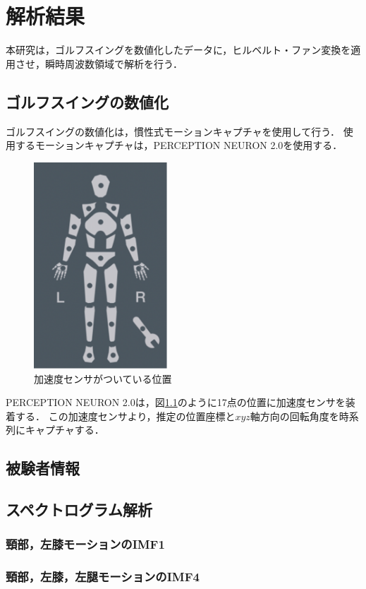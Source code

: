 \chapter{解析結果}
本研究は，ゴルフスイングを数値化したデータに，ヒルベルト・ファン変換を適用させ，瞬時周波数領域で解析を行う．
\section{ゴルフスイングの数値化}
ゴルフスイングの数値化は，慣性式モーションキャプチャを使用して行う．
使用するモーションキャプチャは，PERCEPTION NEURON 2.0を使用する．
\begin{figure}
    \begin{center}
        \includegraphics[width=5.0cm]{./images/sensors.png}
        \caption{加速度センサがついている位置}
        \label{sensors}
    \end{center}
\end{figure}
PERCEPTION NEURON 2.0は，図\ref{sensors}のように17点の位置に加速度センサを装着する．
この加速度センサより，推定の位置座標と$x$$y$$z$軸方向の回転角度を時系列にキャプチャする．


\section{被験者情報}

\section{スペクトログラム解析}
\subsection{頸部，左膝モーションのIMF1}
\subsection{頸部，左膝，左腿モーションのIMF4}